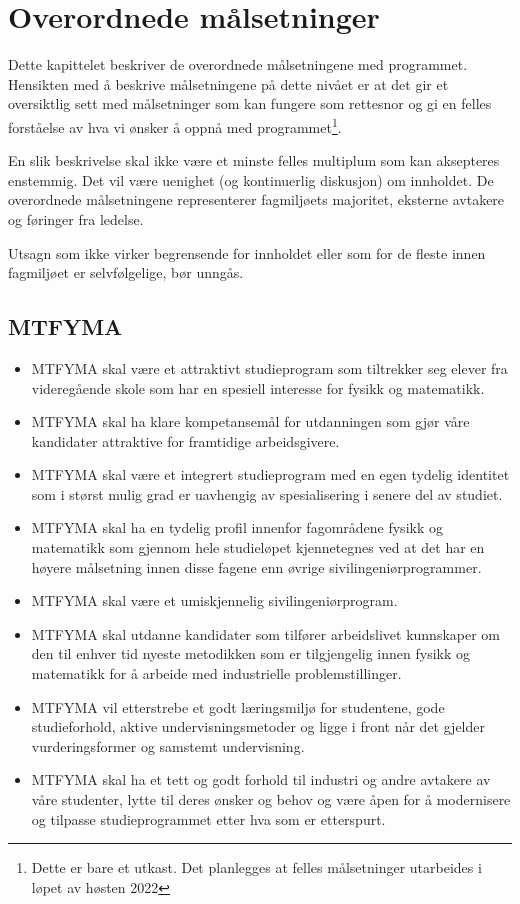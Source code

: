 \chapter{Overordnede målsetninger}

Dette kapittelet beskriver de overordnede målsetningene med programmet. Hensikten med å beskrive målsetningene på dette nivået er at det gir et oversiktlig sett med målsetninger som kan fungere som rettesnor og gi en felles forståelse av hva vi ønsker å oppnå med programmet\footnote{Dette er bare et utkast. Det planlegges at felles målsetninger utarbeides i løpet av høsten 2022}.

En slik beskrivelse skal ikke være et minste felles multiplum som kan aksepteres enstemmig. Det vil være uenighet (og kontinuerlig diskusjon) om innholdet. De overordnede målsetningene representerer fagmiljøets majoritet, eksterne avtakere og føringer fra ledelse. 

Utsagn som ikke virker begrensende for innholdet eller som for de fleste innen fagmiljøet er selvfølgelige, bør unngås.

\section{MTFYMA}

\begin{itemize}
	\item MTFYMA skal være et attraktivt studieprogram som tiltrekker seg elever fra videregående skole som har en spesiell interesse for fysikk og matematikk.
	\item MTFYMA skal ha klare kompetansemål for utdanningen som gjør våre kandidater attraktive for framtidige arbeidsgivere.
	\item MTFYMA skal være et integrert studieprogram med en egen tydelig identitet som i størst mulig grad er uavhengig av spesialisering i senere del av studiet.
	\item MTFYMA skal ha en tydelig profil innenfor fagområdene fysikk og matematikk som gjennom hele studieløpet kjennetegnes ved at det har en høyere målsetning innen disse fagene enn øvrige sivilingeniørprogrammer.
	\item MTFYMA skal være et umiskjennelig sivilingeniørprogram.
	\item MTFYMA skal utdanne kandidater som tilfører arbeidslivet kunnskaper om den til enhver tid nyeste metodikken som er tilgjengelig innen fysikk og matematikk for å arbeide med industrielle problemstillinger.
	\item MTFYMA vil etterstrebe et godt læringsmiljø for studentene, gode studieforhold, aktive undervisningsmetoder og ligge i front når det gjelder vurderingsformer og samstemt undervisning.
	\item MTFYMA skal ha et tett og godt forhold til industri og andre avtakere av våre studenter, lytte til deres ønsker og behov og være åpen for å modernisere og tilpasse studieprogrammet etter hva som er etterspurt.
\end{itemize}

